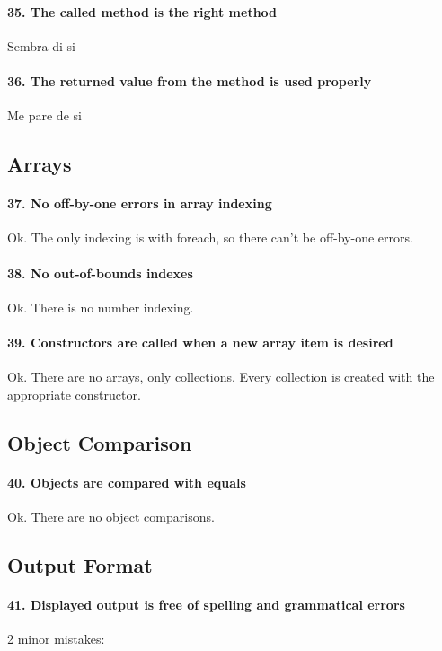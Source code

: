 \documentclass[english]{article}
\begin{document}
\paragraph{35. The called method is the right method}

Sembra di si

\paragraph{36. The returned value from the method is used properly}

Me pare de si


\subsection{Arrays}
\paragraph{37. No off-by-one errors in array indexing}
Ok.
The only indexing is with foreach, so there can't be off-by-one errors.

\paragraph{38. No out-of-bounds indexes}
Ok.
There is no number indexing.

\paragraph{39. Constructors are called when a new array item is desired}
Ok.
There are no arrays, only collections. Every collection is created with the appropriate constructor.

\subsection{Object Comparison}
\paragraph{40. Objects are compared with equals}
Ok.
There are no object comparisons.

\subsection{Output Format}
\paragraph{41. Displayed output is free of spelling and grammatical errors}
2 minor mistakes:
\end{document}
